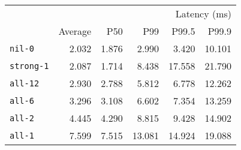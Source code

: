 \begin{tabular}{lrrrrr}
\toprule
 & \multicolumn{5}{r}{Latency (ms)}\\
 & Average & P50 & P99 & P99.5 & P99.9 \\
\midrule
\texttt{nil-0} & 2.032 & 1.876 & 2.990 & 3.420 & 10.101\\
\texttt{strong-1} & 2.087 & 1.714 & 8.438 & 17.558 & 21.790\\
\texttt{all-12} & 2.930 & 2.788 & 5.812 & 6.778 & 12.262\\
\texttt{all-6} & 3.296 & 3.108 & 6.602 & 7.354 & 13.259\\
\texttt{all-2} & 4.445 & 4.290 & 8.815 & 9.428 & 14.902\\
\texttt{all-1} & 7.599 & 7.515 & 13.081 & 14.924 & 19.088\\
\bottomrule
\end{tabular}